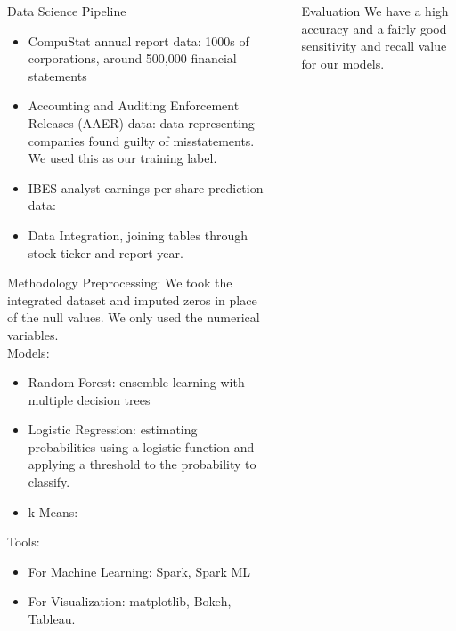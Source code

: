 \documentclass[final]{beamer}
\newlength{\sepwid}
\newlength{\onecolwid}
\begin{document}
\begin{frame}[t]
\begin{columns}[t]
\begin{column}{\onecolwid}
\begin{block}{Data Science Pipeline} 

\begin{itemize}
\item CompuStat annual report data: 1000s of corporations, around 500,000 financial statements
\item Accounting and Auditing Enforcement Releases (AAER) data: data representing companies found guilty of misstatements. We used this as our training label.
\item IBES analyst earnings per share prediction data:
\item Data Integration, joining tables through stock ticker and report year.
\end{itemize}
\end{block}



\begin{block}{Methodology} 
Preprocessing: We took the integrated dataset and imputed zeros in place of the null values.  We only used the numerical variables.\\
Models:
\begin{itemize}
\item Random Forest: ensemble learning with multiple decision trees
\item Logistic Regression: estimating probabilities using a logistic function and applying a threshold to the probability to classify.
\item k-Means: 
\end{itemize}
Tools:
\begin{itemize}
\item For Machine Learning: Spark, Spark ML
\item For Visualization: matplotlib, Bokeh, Tableau.
\end{itemize}
\end{block}

\end{column} %
\begin{column}{\sepwid}\end{column} %
\begin{column}{\onecolwid} 

\begin{alertblock}{Evaluation} 
We have a high accuracy and a fairly good sensitivity and recall value for our models.\\


\end{alertblock}
\end{column}
\end{columns}
\end{frame}
\end{document}
